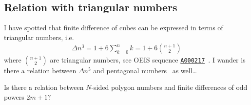 ﻿\subsection{Relation with triangular numbers}\label{subsec:relation_with_triangular_numbers}
I have spotted that finite difference of cubes can be expressed in terms of triangular numbers, i.e.
\begin{align*}
    \Delta n^3  = 1 + 6 \sum_{k=0}^{n} k = 1 + 6 \binom{n+1}{2}
\end{align*}
where $\binom{n+1}{2}$ are triangular numbers,
see OEIS sequence \href{https://oeis.org/A000217}{\texttt{A000217}}~\cite{oeis_sloane2015triangular}.
I wander is there a relation between $\Delta n^5$ and pentagonal numbers~\cite{oeis_sloane2010pentagonal} as well\ldots
\begin{question}
    Is there a relation between $N$-sided polygon numbers and finite differences of odd powers $2m+1$?
\end{question}
